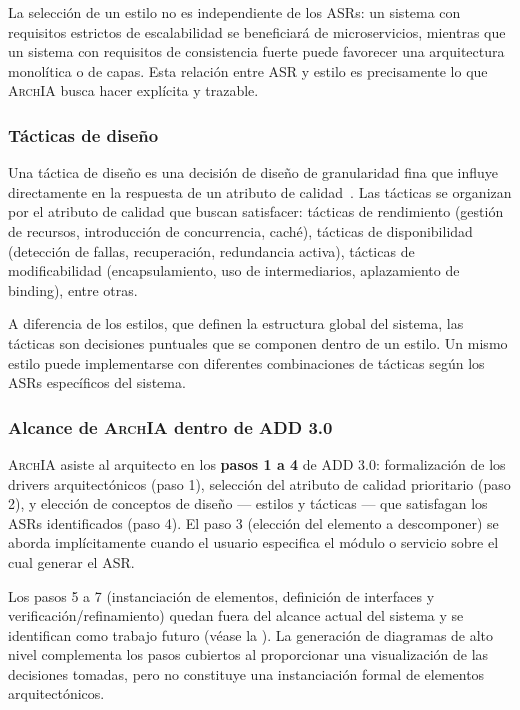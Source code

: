 \documentclass[12pt, letterpaper, oneside]{article}
\newcommand{\archia}{\textsc{ArchIA}}
\begin{document}
La selección de un estilo no es independiente de los ASRs: un sistema con
requisitos estrictos de escalabilidad se beneficiará de microservicios, mientras
que un sistema con requisitos de consistencia fuerte puede favorecer una
arquitectura monolítica o de capas. Esta relación entre ASR y estilo es
precisamente lo que \archia{} busca hacer explícita y trazable.

\subsubsection{Tácticas de diseño}

Una táctica de diseño es una decisión de diseño de granularidad fina que influye
directamente en la respuesta de un atributo de calidad~\cite{bass2021software}.
Las tácticas se organizan por el atributo de calidad que buscan satisfacer:
tácticas de rendimiento (gestión de recursos, introducción de concurrencia, caché),
tácticas de disponibilidad (detección de fallas, recuperación, redundancia
activa), tácticas de modificabilidad (encapsulamiento, uso de intermediarios,
aplazamiento de binding), entre otras.

A diferencia de los estilos, que definen la estructura global del sistema, las
tácticas son decisiones puntuales que se componen dentro de un estilo. Un mismo
estilo puede implementarse con diferentes combinaciones de tácticas según los
ASRs específicos del sistema.

\subsubsection{Alcance de \archia{} dentro de ADD 3.0}

\archia{} asiste al arquitecto en los \textbf{pasos 1 a 4} de ADD 3.0:
formalización de los drivers arquitectónicos (paso 1), selección del atributo de
calidad prioritario (paso 2), y elección de conceptos de diseño --- estilos y
tácticas --- que satisfagan los ASRs identificados (paso 4). El paso 3 (elección
del elemento a descomponer) se aborda implícitamente cuando el usuario especifica
el módulo o servicio sobre el cual generar el ASR.

Los pasos 5 a 7 (instanciación de elementos, definición de interfaces y
verificación/refinamiento) quedan fuera del alcance actual del sistema y se
identifican como trabajo futuro (véase la ). La
generación de diagramas de alto nivel complementa los pasos cubiertos al
proporcionar una visualización de las decisiones tomadas, pero no constituye
una instanciación formal de elementos arquitectónicos.
\end{document}
